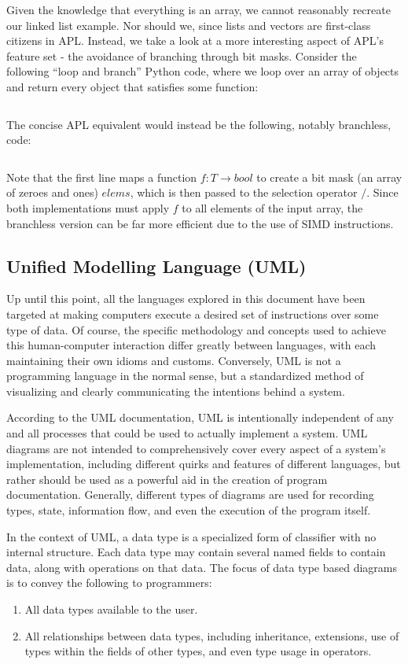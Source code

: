 \documentclass{article}
\begin{document}
Given the knowledge that everything is an array, we cannot reasonably recreate our linked list example. Nor should we,
since lists and vectors are first-class citizens in APL. Instead, we take a look at a more interesting aspect of APL's
feature set - the avoidance of branching through bit masks. Consider the following ``loop and branch'' Python code,
where we loop over an array of objects and return every object that satisfies some function:
\inputminted{python}{linked_list/apl_example.py}

The concise APL equivalent would instead be the following, notably branchless, code:
\inputminted{apl}{linked_list/main.apl}
Note that the first line maps a function $f: T \rightarrow bool$ to create a bit mask
(an array of zeroes and ones) $elems$, which is then passed to the selection operator $/$.
Since both implementations must apply $f$ to all elements of the input array, the branchless version can
be far more efficient due to the use of SIMD instructions.

\subsection{Unified Modelling Language (UML)}

Up until this point, all the languages explored in this document have been targeted at making computers
execute a desired set of instructions over some type of data. Of course, the specific methodology
and concepts used to achieve this human-computer interaction differ greatly between languages,
with each maintaining their own idioms and customs. Conversely, UML is not a programming language in
the normal sense, but a standardized method of visualizing and clearly communicating the intentions behind a system.

According to the UML documentation, UML is intentionally independent of any and all processes that could be used
to actually implement a system. UML diagrams are not intended to comprehensively cover every aspect of a system's implementation,
including different quirks and features of different languages, but rather should be used as a powerful aid in
the creation of program documentation. Generally, different types of diagrams are used for recording types, state, information flow,
and even the execution of the program itself.

In the context of UML, a data type is a specialized form of classifier with no internal structure. Each data type may contain
several named fields to contain data, along with operations on that data.
The focus of data type based diagrams is to convey the following to programmers:
\begin{enumerate}
    \item All data types available to the user.
    \item All relationships between data types, including inheritance, extensions, use of types within the fields of other types,
    and even type usage in operators.
\end{enumerate}
\end{document}
